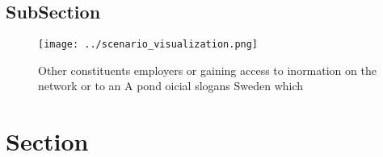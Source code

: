 \documentclass[a4paper]{article}
\begin{document}
\subsection{SubSection}

\begin{figure}
\centering
\texttt{[image: ../scenario\_visualization.png]}
\caption{Other constituents employers or gaining access to inormation on the network or to an A pond oicial slogans Sweden which
}
\end{figure}
 
\section{Section}
\end{document}
